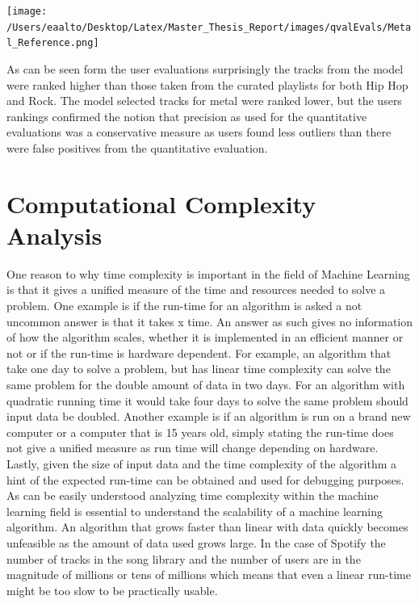 \documentclass[a4paper,11pt]{kth-mag}
\begin{document}
\texttt{[image: /Users/eaalto/Desktop/Latex/Master\_Thesis\_Report/images/qvalEvals/Metal\_Reference.png]}

As can be seen form the user evaluations surprisingly the tracks from the model were ranked higher than those taken from the curated playlists for both Hip Hop and Rock. The model selected tracks for metal were ranked lower, but the users rankings confirmed the notion that precision as used for the quantitative evaluations was a conservative measure as users found less outliers than there were false positives from the quantitative evaluation.

\chapter{Computational Complexity Analysis}
One reason to why time complexity is important in the field of Machine Learning is that it gives a unified measure of the time and resources needed to solve a problem. One example is if the run-time for an algorithm is asked a not uncommon answer is that it takes x time. An answer as such gives no information of how the algorithm scales, whether it is implemented in an efficient manner or not or if the run-time is hardware dependent. For example, an algorithm that take one day to solve a problem, but has linear time complexity can solve the same problem for the double amount of data in two days. For an algorithm with quadratic running time it would take four days to solve the same problem should input data be doubled. Another example is if an algorithm is run on a brand new computer or a computer that is 15 years old, simply stating the run-time does not give a unified measure as run time will change depending on hardware. Lastly, given the size of input data and the time complexity of the algorithm a hint of the expected run-time can be obtained and used for debugging purposes.
 As can be easily understood analyzing time complexity within the machine learning field is essential to understand the scalability of a machine learning algorithm. An algorithm that grows faster than linear with data quickly becomes unfeasible as the amount of data used grows large. In the case of Spotify the number of tracks in the song library and the number of users are in the magnitude of millions or tens of millions which means that even a linear run-time might be too slow to be practically usable.
 
\end{document}
